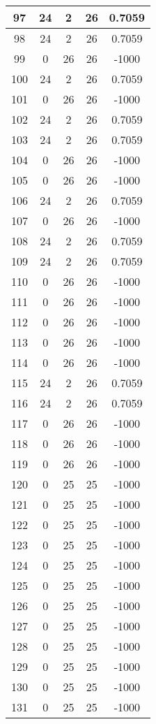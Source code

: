 \documentclass[letterpaper, 12pt]{article}
\begin{document}
\begin{longtable}{|c|c|c|c|c|}
\hline
97 & 24 & 2 & 26 & 0.7059 \\
\hline
98 & 24 & 2 & 26 & 0.7059 \\
\hline
99 & 0 & 26 & 26 & -1000 \\
\hline
100 & 24 & 2 & 26 & 0.7059 \\
\hline
101 & 0 & 26 & 26 & -1000 \\
\hline
102 & 24 & 2 & 26 & 0.7059 \\
\hline
103 & 24 & 2 & 26 & 0.7059 \\
\hline
104 & 0 & 26 & 26 & -1000 \\
\hline
105 & 0 & 26 & 26 & -1000 \\
\hline
106 & 24 & 2 & 26 & 0.7059 \\
\hline
107 & 0 & 26 & 26 & -1000 \\
\hline
108 & 24 & 2 & 26 & 0.7059 \\
\hline
109 & 24 & 2 & 26 & 0.7059 \\
\hline
110 & 0 & 26 & 26 & -1000 \\
\hline
111 & 0 & 26 & 26 & -1000 \\
\hline
112 & 0 & 26 & 26 & -1000 \\
\hline
113 & 0 & 26 & 26 & -1000 \\
\hline
114 & 0 & 26 & 26 & -1000 \\
\hline
115 & 24 & 2 & 26 & 0.7059 \\
\hline
116 & 24 & 2 & 26 & 0.7059 \\
\hline
117 & 0 & 26 & 26 & -1000 \\
\hline
118 & 0 & 26 & 26 & -1000 \\
\hline
119 & 0 & 26 & 26 & -1000 \\
\hline
120 & 0 & 25 & 25 & -1000 \\
\hline
121 & 0 & 25 & 25 & -1000 \\
\hline
122 & 0 & 25 & 25 & -1000 \\
\hline
123 & 0 & 25 & 25 & -1000 \\
\hline
124 & 0 & 25 & 25 & -1000 \\
\hline
125 & 0 & 25 & 25 & -1000 \\
\hline
126 & 0 & 25 & 25 & -1000 \\
\hline
127 & 0 & 25 & 25 & -1000 \\
\hline
128 & 0 & 25 & 25 & -1000 \\
\hline
129 & 0 & 25 & 25 & -1000 \\
\hline
130 & 0 & 25 & 25 & -1000 \\
\hline
131 & 0 & 25 & 25 & -1000 \\

\end{longtable}
\end{document}
